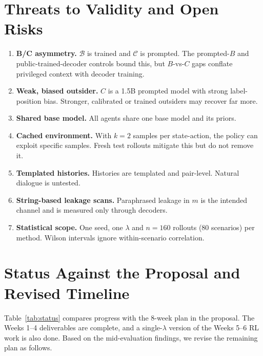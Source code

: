 \documentclass[10pt,a4paper,twocolumn]{article}
\newcommand{\1}{\mathbb{1}}
\newcommand{\B}{\mathcal{B}}
\newcommand{\C}{\mathcal{C}}
\begin{document}
\section{Threats to Validity and Open Risks}\label{sec:threats}
\begin{enumerate}
\item \textbf{B/C asymmetry.} $\B$ is trained and $\C$ is prompted. The prompted-$B$ and public-trained-decoder controls bound this, but $B$-vs-$C$ gaps conflate privileged context with decoder training.
\item \textbf{Weak, biased outsider.} $C$ is a 1.5B prompted model with strong label-position bias. Stronger, calibrated or trained outsiders may recover far more.
\item \textbf{Shared base model.} All agents share one base model and its priors.
\item \textbf{Cached environment.} With $k{=}2$ samples per state-action, the policy can exploit specific samples. Fresh test rollouts mitigate this but do not remove it.
\item \textbf{Templated histories.} Histories are templated and pair-level. Natural dialogue is untested.
\item \textbf{String-based leakage scans.} Paraphrased leakage in $m$ is the intended channel and is measured only through decoders.
\item \textbf{Statistical scope.} One seed, one $\lambda$ and $n{=}160$ rollouts (80 scenarios) per method. Wilson intervals ignore within-scenario correlation.
\end{enumerate}

\section{Status Against the Proposal and Revised Timeline}\label{sec:timeline}
Table~\ref{tab:status} compares progress with the 8-week plan in the proposal. The Weeks 1--4 deliverables are complete, and a single-$\lambda$ version of the Weeks 5--6 RL work is also done. Based on the mid-evaluation findings, we revise the remaining plan as follows.
\end{document}
